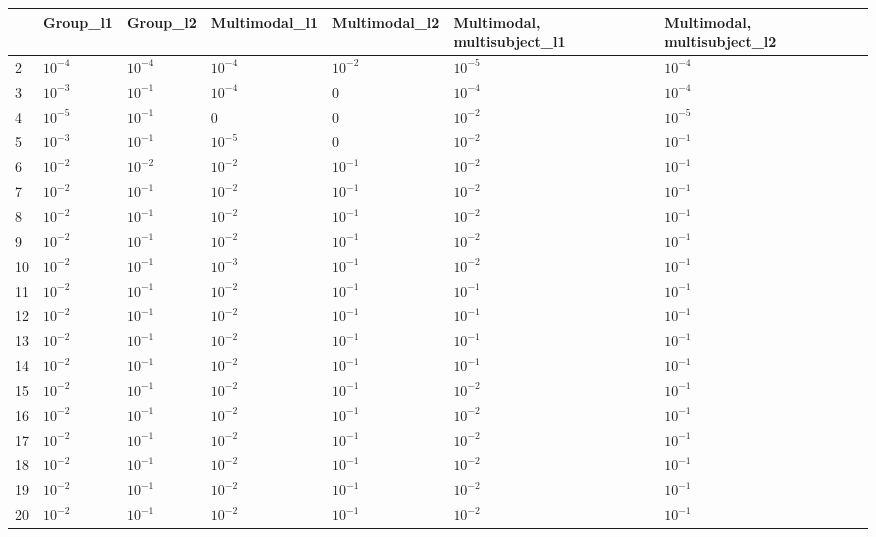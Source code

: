 \begin{tabular}{lllllll}
\toprule
 & Group_l1 & Group_l2 & Multimodal_l1 & Multimodal_l2 & Multimodal, multisubject_l1 & Multimodal, multisubject_l2 \\
\midrule
2 & $10^{-4}$ & $10^{-4}$ & $10^{-4}$ & $10^{-2}$ & $10^{-5}$ & $10^{-4}$ \\
3 & $10^{-3}$ & $10^{-1}$ & $10^{-4}$ & $0$ & $10^{-4}$ & $10^{-4}$ \\
4 & $10^{-5}$ & $10^{-1}$ & $0$ & $0$ & $10^{-2}$ & $10^{-5}$ \\
5 & $10^{-3}$ & $10^{-1}$ & $10^{-5}$ & $0$ & $10^{-2}$ & $10^{-1}$ \\
6 & $10^{-2}$ & $10^{-2}$ & $10^{-2}$ & $10^{-1}$ & $10^{-2}$ & $10^{-1}$ \\
7 & $10^{-2}$ & $10^{-1}$ & $10^{-2}$ & $10^{-1}$ & $10^{-2}$ & $10^{-1}$ \\
8 & $10^{-2}$ & $10^{-1}$ & $10^{-2}$ & $10^{-1}$ & $10^{-2}$ & $10^{-1}$ \\
9 & $10^{-2}$ & $10^{-1}$ & $10^{-2}$ & $10^{-1}$ & $10^{-2}$ & $10^{-1}$ \\
10 & $10^{-2}$ & $10^{-1}$ & $10^{-3}$ & $10^{-1}$ & $10^{-2}$ & $10^{-1}$ \\
11 & $10^{-2}$ & $10^{-1}$ & $10^{-2}$ & $10^{-1}$ & $10^{-1}$ & $10^{-1}$ \\
12 & $10^{-2}$ & $10^{-1}$ & $10^{-2}$ & $10^{-1}$ & $10^{-1}$ & $10^{-1}$ \\
13 & $10^{-2}$ & $10^{-1}$ & $10^{-2}$ & $10^{-1}$ & $10^{-1}$ & $10^{-1}$ \\
14 & $10^{-2}$ & $10^{-1}$ & $10^{-2}$ & $10^{-1}$ & $10^{-1}$ & $10^{-1}$ \\
15 & $10^{-2}$ & $10^{-1}$ & $10^{-2}$ & $10^{-1}$ & $10^{-2}$ & $10^{-1}$ \\
16 & $10^{-2}$ & $10^{-1}$ & $10^{-2}$ & $10^{-1}$ & $10^{-2}$ & $10^{-1}$ \\
17 & $10^{-2}$ & $10^{-1}$ & $10^{-2}$ & $10^{-1}$ & $10^{-2}$ & $10^{-1}$ \\
18 & $10^{-2}$ & $10^{-1}$ & $10^{-2}$ & $10^{-1}$ & $10^{-2}$ & $10^{-1}$ \\
19 & $10^{-2}$ & $10^{-1}$ & $10^{-2}$ & $10^{-1}$ & $10^{-2}$ & $10^{-1}$ \\
20 & $10^{-2}$ & $10^{-1}$ & $10^{-2}$ & $10^{-1}$ & $10^{-2}$ & $10^{-1}$ \\
\bottomrule
\end{tabular}
